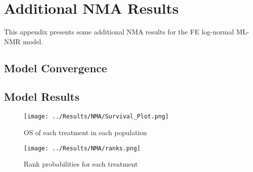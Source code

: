\chapter{Additional NMA Results}\label{NMAAppendix}

This appendix presents some additional NMA results for the FE log-normal ML-NMR model. 

\section{Model Convergence}
\section{Model Results}

\begin{figure}[h]
    \centering
    \texttt{[image: ../Results/NMA/Survival\_Plot.png]}
    \caption{OS of each treatment in each population}
    \label{fig:pred_survbc}
\end{figure}

\begin{figure}[h]
    \centering
    \texttt{[image: ../Results/NMA/ranks.png]}
    \caption{Rank probabilities for each treatment}
    \label{fig:rankplot}
\end{figure}
